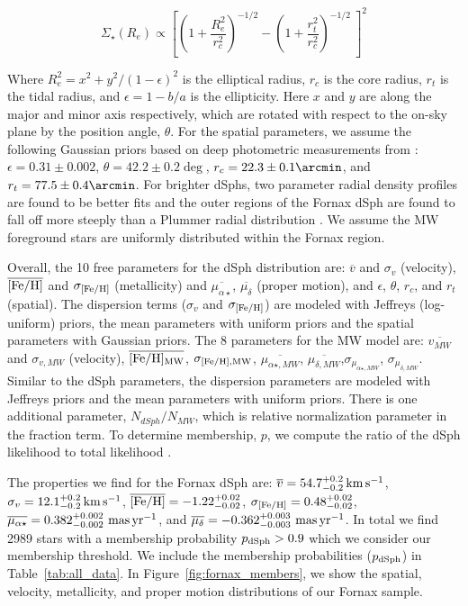 \documentclass[twocolumn]{aastex63}
\begin{document}
 \begin{equation}
	\Sigma_{\star} (R_e) \propto \left[ \left(1 + \frac{R_e^2}{r_c^2} \right)^{-1/2} - \left(1 + \frac{r_t^2}{r_c^2} \right)^{-1/2} \: \right]^2
 \end{equation}

\noindent Where $R_e^2=x^2 + y^2/(1-\epsilon)^2$ is the elliptical radius, $r_c$ is the core radius, $r_t$ is the tidal radius, and $\epsilon=1-b/a$ is the ellipticity. Here $x$ and $y$ are along the major and minor axis respectively, which are rotated with respect to the on-sky plane by the position angle, $\theta$. 
For the spatial parameters,  we assume the following Gaussian priors based on deep photometric measurements from \citet{Wang2019ApJ...881..118W}: $\epsilon=0.31\pm0.002$, $\theta=42.2\pm0.2 \deg$, $r_c=22.3\pm0.1 \arcmin$, and $r_t=77.5\pm0.4 \arcmin$.
For brighter dSphs, two parameter radial density profiles are found to be better fits \citep{Munoz2018ApJ...860...66M} and the outer regions of the Fornax dSph are found to fall off more steeply than a Plummer radial distribution \citep{Moskowitz2020ApJ...892...27M}.
We assume the MW foreground stars are uniformly distributed within the Fornax region.

Overall, the 10 free parameters for the dSph distribution are: $\overline{v}$ and $\sigma_v$ (velocity), $\overline{\rm [Fe/H]}$ and  $\sigma_{\rm [Fe/H]}$ (metallicity) and $\overline{\mu_{\alpha \star}}$, $\overline{\mu_{\delta}}$ (proper motion), and $\epsilon$, $\theta$, $r_c$, and $r_t$ (spatial). 
The dispersion terms ($\sigma_v$ and $\sigma_{\rm [Fe/H]}$) are modeled with Jeffreys (log-uniform) priors, the mean parameters with uniform priors and the spatial parameters with Gaussian priors. 
The 8 parameters for the MW model are:  $\overline{v_{MW}}$ and $\sigma_{v, MW}$ (velocity), $\overline{\rm [Fe/H]_{MW}}$, $\sigma_{\rm [Fe/H], MW}$, $\overline{\mu_{\alpha \star, MW}}$, $\overline{\mu_{\delta, MW}}$,$\sigma_{\mu_{\alpha \star, MW}}$,  $\sigma_{\mu_{\delta, MW}}$.  
Similar to the dSph parameters, the dispersion parameters are modeled with Jeffreys priors and the mean parameters with uniform priors.
There is one additional parameter, $N_{dSph}/N_{MW}$, which is relative normalization parameter in the fraction term.
To determine membership, $p$, we compute the ratio of the dSph likelihood to total likelihood  \citep{Pace2020MNRAS.495.3022P}.




The properties we find for the  Fornax dSph are:
$\overline{v} = 54.7_{-0.2}^{+0.2} \mathrm{\,km} \mathrm{\,s}^{-1}$,
$\sigma_v = 12.1_{-0.2}^{+0.2} \mathrm{\,km} \mathrm{\,s}^{-1}$,
$\overline{\rm [Fe/H]} = -1.22_{-0.02}^{+0.02}$,
$\sigma_{\rm [Fe/H]} = 0.48_{-0.02}^{+0.02}$,
$\overline{\mu_{\alpha \star}} = 0.382_{-0.002}^{+0.002} \mathrm{\,\mathrm{\,mas} \mathrm{\,yr}^{-1}}$, and
$\overline{\mu_{\delta}} = -0.362_{-0.003}^{+0.003} \mathrm{\,\mathrm{\,mas} \mathrm{\,yr}^{-1}}$.
In total we find 2989 stars with a membership probability $p_{\rm dSph}>0.9$ which we consider our membership threshold.
We include  the membership probabilities ($p_{\rm dSph}$)  in Table~\ref{tab:all_data}.
In Figure~\ref{fig:fornax_members}, we show the spatial, velocity, metallicity, and proper motion distributions of our Fornax sample.  
\end{document}
